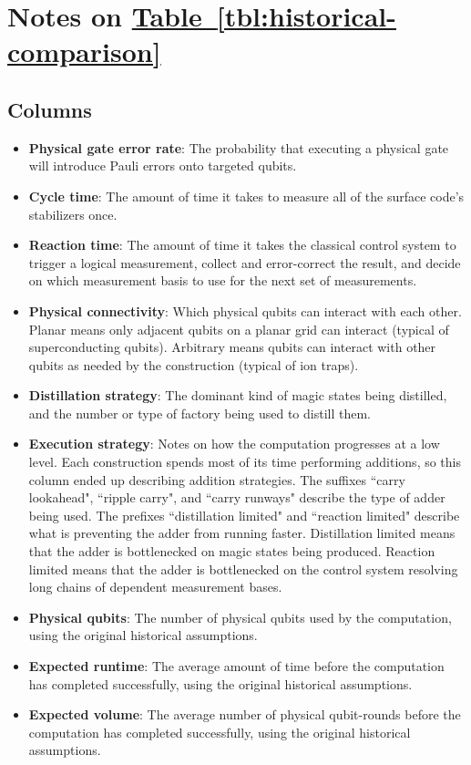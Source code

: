 \documentclass[superscriptaddress,notitlepage,longbibliography]{revtex4-1}
\theoremstyle{definition}
\theoremstyle{definition}
\newcommand{\tbl}[1]{\hyperref[tbl:#1]{Table~\ref*{tbl:#1}}}
\begin{document}
\section{Notes on \texorpdfstring{\tbl{historical-comparison}}{Table II}}
\label{app:historical-table-details}

\subsection{Columns}

\begin{itemize}
    \item \textbf{Physical gate error rate}:
        The probability that executing a physical gate will introduce Pauli errors onto targeted qubits.
    \item \textbf{Cycle time}:
        The amount of time it takes to measure all of the surface code's stabilizers once.
    \item \textbf{Reaction time}:
        The amount of time it takes the classical control system to trigger a logical measurement, collect and error-correct the result, and decide on which measurement basis to use for the next set of measurements.
    \item \textbf{Physical connectivity}:
        Which physical qubits can interact with each other.
        Planar means only adjacent qubits on a planar grid can interact (typical of superconducting qubits).
        Arbitrary means qubits can interact with other qubits as needed by the construction (typical of ion traps).
    \item \textbf{Distillation strategy}:
        The dominant kind of magic states being distilled, and the number or type of factory being used to distill them.
    \item \textbf{Execution strategy}:
        Notes on how the computation progresses at a low level.
        Each construction spends most of its time performing additions, so this column ended up describing addition strategies.
        The suffixes ``carry lookahead", ``ripple carry", and ``carry runways" describe the type of adder being used.
        The prefixes ``distillation limited" and ``reaction limited" describe what is preventing the adder from running faster.
        Distillation limited means that the adder is bottlenecked on magic states being produced.
        Reaction limited means that the adder is bottlenecked on the control system resolving long chains of dependent measurement bases.
    \item \textbf{Physical qubits}:
        The number of physical qubits used by the computation, using the original historical assumptions.
    \item \textbf{Expected runtime}:
        The average amount of time before the computation has completed successfully, using the original historical assumptions.
    \item \textbf{Expected volume}:
        The average number of physical qubit-rounds before the computation has completed successfully, using the original historical assumptions.
\end{itemize}
\end{document}
